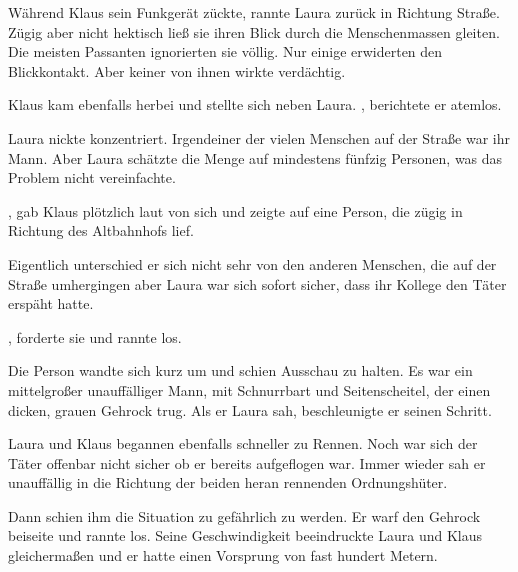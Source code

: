\par

Während Klaus sein Funkgerät zückte, rannte Laura zurück in Richtung Straße. Zügig aber nicht hektisch ließ sie ihren Blick durch die Menschenmassen gleiten. Die meisten Passanten ignorierten sie völlig. Nur einige erwiderten den Blickkontakt. Aber keiner von ihnen wirkte verdächtig.

\par

Klaus kam ebenfalls herbei und stellte sich neben Laura. , berichtete er atemlos. 

\par

Laura nickte konzentriert. Irgendeiner der vielen Menschen auf der Straße war ihr Mann. Aber Laura schätzte die Menge auf mindestens fünfzig Personen, was das Problem nicht vereinfachte.

\par

, gab Klaus plötzlich laut von sich und zeigte auf eine Person, die zügig in Richtung des Altbahnhofs lief.

\par

Eigentlich unterschied er sich nicht sehr von den anderen Menschen, die auf der Straße umhergingen aber Laura war sich sofort sicher, dass ihr Kollege den Täter erspäht hatte.

\par

, forderte sie und rannte los.

\par

Die Person wandte sich kurz um und schien Ausschau zu halten. Es war ein mittelgroßer unauffälliger Mann, mit Schnurrbart und Seitenscheitel, der einen dicken, grauen Gehrock trug. Als er Laura sah, beschleunigte er seinen Schritt.

\par

Laura und Klaus begannen ebenfalls schneller zu Rennen. Noch war sich der Täter offenbar nicht sicher ob er bereits aufgeflogen war. Immer wieder sah er unauffällig in die Richtung der beiden heran rennenden Ordnungshüter.

\par

Dann schien ihm die Situation zu gefährlich zu werden. Er warf den Gehrock beiseite und rannte los. Seine Geschwindigkeit beeindruckte Laura und Klaus gleichermaßen und er hatte einen Vorsprung von fast hundert Metern.

